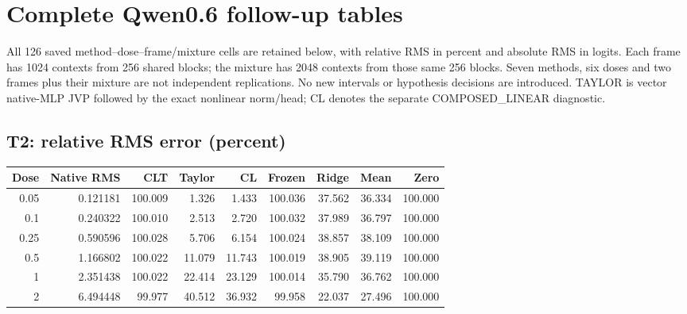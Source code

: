 \section{Complete Qwen0.6 follow-up tables}\label{app:qwen}
All 126 saved method--dose--frame/mixture cells are retained below, with relative RMS in percent and absolute RMS in logits. Each frame has 1024 contexts from 256 shared blocks; the mixture has 2048 contexts from those same 256 blocks. Seven methods, six doses and two frames plus their mixture are not independent replications. No new intervals or hypothesis decisions are introduced. TAYLOR is vector native-MLP JVP followed by the exact nonlinear norm/head; CL denotes the separate COMPOSED\_LINEAR diagnostic.
\subsection{T2: relative RMS error (percent)}
\begin{center}\scriptsize
\begin{tabular}{rrrrrrrrr}
\toprule Dose & Native RMS & CLT & Taylor & CL & Frozen & Ridge & Mean & Zero\\\midrule
0.05 & 0.121181 & 100.009 & 1.326 & 1.433 & 100.036 & 37.562 & 36.334 & 100.000\\
0.1 & 0.240322 & 100.010 & 2.513 & 2.720 & 100.032 & 37.989 & 36.797 & 100.000\\
0.25 & 0.590596 & 100.028 & 5.706 & 6.154 & 100.024 & 38.857 & 38.109 & 100.000\\
0.5 & 1.166802 & 100.022 & 11.079 & 11.743 & 100.019 & 38.905 & 39.119 & 100.000\\
1 & 2.351438 & 100.022 & 22.414 & 23.129 & 100.014 & 35.790 & 36.762 & 100.000\\
2 & 6.494448 & 99.977 & 40.512 & 36.932 & 99.958 & 22.037 & 27.496 & 100.000\\
\bottomrule\end{tabular}\end{center}
